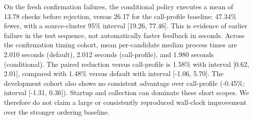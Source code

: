 On the fresh confirmation failures, the conditional policy executes a mean of 13.78 checks before rejection, versus 26.17 for the call-profile baseline: 47.34\% fewer, with a source-cluster 95\% interval [19.26, 77.46]. This is evidence of earlier failure in the test sequence, not automatically faster feedback in seconds. Across the confirmation timing cohort, mean per-candidate median process times are 2.010 seconds (default), 2.012 seconds (call-profile), and 1.980 seconds (conditional). The paired reduction versus call-profile is 1.58\% with interval [0.62, 2.01], compared with 1.48\% versus default with interval [-1.06, 5.70]. The development cohort also shows no consistent advantage over call-profile (-0.45\%; interval [-1.31, 0.36]). Startup and collection can dominate these short scopes. We therefore do not claim a large or consistently reproduced wall-clock improvement over the stronger ordering baseline.
